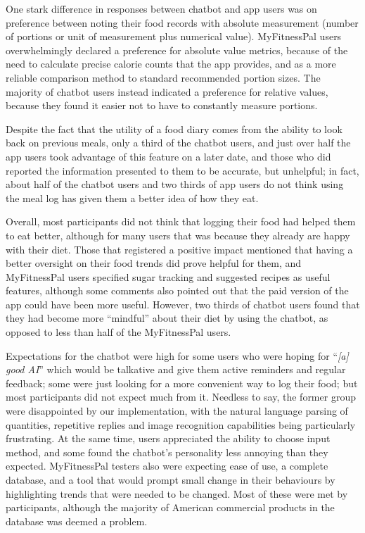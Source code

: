 One stark difference in responses between chatbot and app users was on preference between noting their food records with absolute measurement (number of portions or unit of measurement plus numerical value). MyFitnessPal users overwhelmingly declared a preference for absolute value metrics, because of the need to calculate precise calorie counts that the app provides, and as a more reliable comparison method to standard recommended portion sizes. The majority of chatbot users instead indicated a preference for relative values, because they found it easier not to have to constantly measure portions. 

Despite the fact that the utility of a food diary comes from the ability to look back on previous meals, only a third of the chatbot users, and just over half the app users took advantage of this feature on a later date, and those who did reported the information presented to them to be accurate, but unhelpful; in fact, about half of the chatbot users and two thirds of app users do not think using the meal log has given them a better idea of how they eat. 

Overall, most participants did not think that logging their food had helped them to eat better, although for many users that was because they already are happy with their diet. Those that registered a positive impact mentioned that having a better oversight on their food trends did prove helpful for them, and MyFitnessPal users specified sugar tracking and suggested recipes as useful features, although some comments also pointed out that the paid version of the app could have been more useful. However, two thirds of chatbot users found that they had become more ``mindful'' about their diet by using the chatbot, as opposed to less than half of the MyFitnessPal users. 

Expectations for the chatbot were high for some users who were hoping for ``\textit{[a] good AI}'' which would be talkative and give them active reminders and regular feedback; some were just looking for a more convenient way to log their food; but most participants did not expect much from it. Needless to say, the former group were disappointed by our implementation, with the natural language parsing of quantities, repetitive replies and image recognition capabilities being particularly frustrating. At the same time, users appreciated the ability to choose input method, and some found the chatbot's personality less annoying than they expected. MyFitnessPal testers also were expecting ease of use, a complete database, and a tool that would prompt small change in their behaviours by highlighting trends that were needed to be changed. Most of these were met by participants, although the majority of American commercial products in the database was deemed a problem. 

